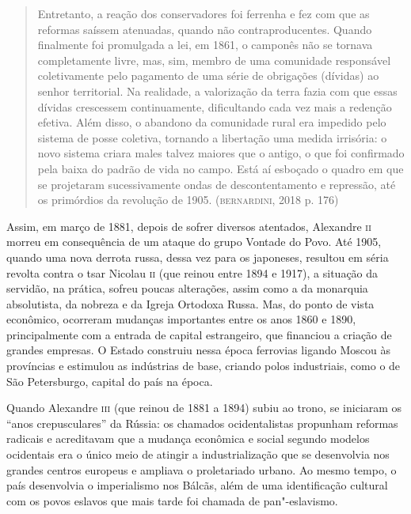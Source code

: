 \documentclass[11pt]{extarticle}
\begin{document}
\begin{quote}
Entretanto, a reação dos conservadores foi ferrenha e fez com que as
reformas saíssem atenuadas, quando não contraproducentes. Quando
finalmente foi promulgada a lei, em 1861, o camponês não se tornava
completamente livre, mas, sim, membro de uma comunidade responsável
coletivamente pelo pagamento de uma série de obrigações (dívidas) ao
senhor territorial. Na realidade, a valorização da terra fazia com que
essas dívidas crescessem continuamente, dificultando cada vez mais a
redenção efetiva. Além disso, o abandono da comunidade rural era
impedido pelo sistema de posse coletiva, tornando a libertação uma
medida irrisória: o novo sistema criara males talvez maiores que o
antigo, o que foi confirmado pela baixa do padrão de vida no campo. Está
aí esboçado o quadro em que se projetaram sucessivamente ondas de
descontentamento e repressão, até os primórdios da revolução de 1905.
(\textsc{bernardini}, 2018 p. 176)
\end{quote}


Assim, em março de 1881, depois de sofrer diversos atentados, Alexandre
\textsc{ii} morreu em consequência de um ataque do grupo Vontade do Povo. Até
1905, quando uma nova derrota russa, dessa vez para os japoneses,
resultou em séria revolta contra o tsar Nicolau \textsc{ii} (que reinou entre
1894 e 1917), a situação da servidão, na prática, sofreu poucas
alterações, assim como a da monarquia absolutista, da nobreza e da
Igreja Ortodoxa Russa. Mas, do ponto de vista econômico, ocorreram
mudanças importantes entre os anos 1860 e 1890, principalmente com a
entrada de capital estrangeiro, que financiou a criação de grandes
empresas. O Estado construiu nessa época ferrovias ligando Moscou às
províncias e estimulou as indústrias de base, criando polos industriais,
como o de São Petersburgo, capital do país na época.



Quando Alexandre \textsc{iii} (que reinou de 1881 a 1894) subiu ao trono, se
iniciaram os ``anos crepusculares'' da Rússia: os chamados
ocidentalistas propunham reformas radicais e acreditavam que a mudança
econômica e social segundo modelos ocidentais era o único meio de
atingir a industrialização que se desenvolvia nos grandes centros
europeus e ampliava o proletariado urbano. Ao mesmo tempo, o país
desenvolvia o imperialismo nos Bálcãs, além de uma identificação
cultural com os povos eslavos que mais tarde foi chamada de
pan"-eslavismo.
\end{document}
